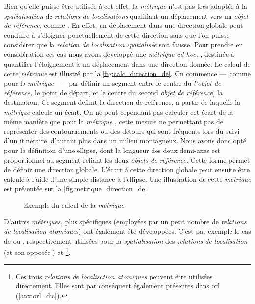Bien qu'elle puisse être utilisée à cet effet, la \emph{métrique}
 n'est pas très adaptée à la
\emph{spatialisation} de \emph{relations de localisations} qualifiant
un déplacement vers un \emph{objet de référence,} comme
. En effet, un déplacement dans une
direction globale peut conduire à s'éloigner ponctuellement de cette
direction sans que l'on puisse considérer que la \emph{relation de
  localisation spatialisée} soit fausse. Pour prendre en considération
ces cas nous avons développé une \emph{métrique} \emph{ad hoc,}
, destinée à quantifier l'éloignement à un
déplacement dans une direction donnée. Le calcul de cette
\emph{métrique} est illustré par la
\autoref{fig:calc_direction_de}. On commence ---~comme pour la
\emph{métrique} ~--- par définir un segment
entre le centre du \emph{l'objet de référence,} le point de départ, et
le centre du second \emph{objet de référence,} la destination. Ce
segment définit la direction de référence, à partir de laquelle la
\emph{métrique} calcule un écart. On ne peut cependant pas calculer
cet écart de la même manière que pour la \emph{métrique}
, cette mesure ne permettant pas de représenter
des contournements ou des détours qui sont fréquents lors du suivi
d'un itinéraire, d'autant plus dans un milieu montagneux. Nous avons
donc opté pour la définition d'une ellipse, dont la longueur des deux
demi-axes est proportionnel au segment reliant les deux \emph{objets
  de référence.} Cette forme permet de définir une direction
globale. L'écart à cette direction globale peut ensuite être calculé à
l'aide d'une simple distance à l'ellipse. Une illustration de cette
\emph{métrique} est présentée sur la
\autoref{fig:metrique_direction_de}.

\begin{figure}
  \centering
  
  \caption{Exemple du calcul de la \emph{métrique}
    \protect{}}
  \label{fig:metrique_direction_de}
\end{figure}

D'autres \emph{métriques,} plus spécifiques (\ie employées par un
petit nombre de \emph{relations de localisation atomiques}) ont
également été développées. C'est par exemple le cas de
 ou , respectivement
utilisées pour la \emph{spatialisation} des \emph{relations de
  localisation}  (et son opposée
) et 
\footnote{Ces trois \emph{relations de localisation atomiques} peuvent
  être utilisées directement. Elles sont par conséquent également
  présentes dans \ac{orl} (\autoref{anx:orl_dic}).}.


